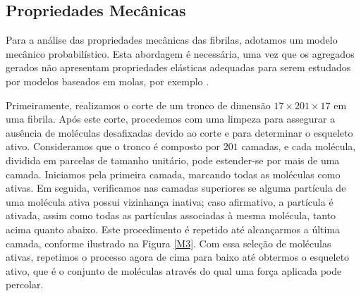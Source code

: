 \documentclass{article}
\begin{document}
    \subsection{Propriedades Mecânicas} 

        Para a análise das propriedades mecânicas das fibrilas, adotamos um modelo mecânico probabilístico. Esta abordagem é necessária, uma vez
        que os agregados gerados não apresentam propriedades elásticas adequadas para serem estudados por modelos baseados em molas, por exemplo
        \cite{Parkinson1997,Saitoh2020MolecularDS}.

        Primeiramente, realizamos o corte de um tronco de dimensão \(17 \times 201 \times 17\) em uma fibrila. Após este corte, procedemos com 
        uma limpeza para assegurar a ausência de moléculas desafixadas devido ao corte e para determinar o esqueleto ativo. Consideramos que o 
        tronco é composto por \(201\) camadas, e cada molécula, dividida em parcelas de tamanho unitário, pode estender-se por mais de uma camada.
        Iniciamos pela primeira camada, marcando todas as moléculas como ativas. Em seguida, verificamos nas camadas superiores se alguma 
        partícula de uma molécula ativa possui vizinhança inativa; caso afirmativo, a partícula é ativada, assim como todas as partículas 
        associadas à mesma molécula, tanto acima quanto abaixo. Este procedimento é repetido até alcançarmos a última camada, conforme ilustrado 
        na Figura \ref{M3}. Com essa seleção de moléculas ativas, repetimos o processo agora de cima para baixo até obtermos o esqueleto ativo, 
        que é o conjunto de moléculas através do qual uma força aplicada pode percolar. 
\end{document}
